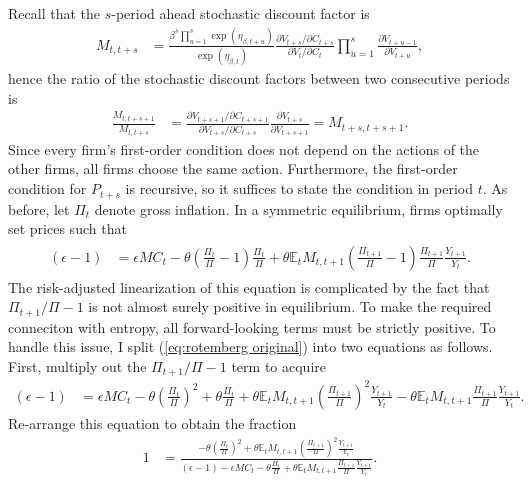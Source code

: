 \documentclass[12 pt, oneside]{article}
\theoremstyle{definition}
\theoremstyle{definition}
\theoremstyle{definition}
\newcommand{\E}{\mathbb{E}}
\begin{document}
Recall that the $s$-period ahead stochastic discount factor is
\begin{align}
  M_{t, t + s} & = \frac{\beta^s \prod_{u = 1}^s\exp(\eta_{\beta, t + u})}{\exp(\eta_{\beta, t})}\frac{\partial V_{t + s} / \partial C_{t + s}}{\partial V_t / \partial C_t} \prod_{u = 1}^s \frac{\partial V_{t + u - 1}}{\partial V_{t + u}},
\end{align}
hence the ratio of the stochastic discount factors between two consecutive periods is
\begin{align*}
  \frac{M_{t, t + s + 1}}{M_{t, t + s}} & = \frac{\partial V_{t + s + 1} / \partial C_{t + s + 1}}{\partial V_{t + s} / \partial C_{t + s}} \frac{\partial V_{t + s}}{\partial V_{t + s + 1}} = M_{t + s, t + s + 1}.
\end{align*}
Since every firm's first-order condition does not depend on the actions of the other firms, all firms choose the same action.
Furthermore, the first-order condition for $P_{t + s}$ is recursive, so it suffices to state the condition in period $t$.
As before, let $\Pi_t$ denote gross inflation. In a symmetric equilibrium, firms optimally set prices such that
\begin{align}\label{eq:rotemberg original}
  \begin{split}
    (\epsilon - 1) & = \epsilon MC_t - \theta \left(\frac{\Pi_t}{\Pi} - 1\right) \frac{\Pi_t}{\Pi} + \theta\E_t M_{t, t + 1}\left(\frac{\Pi_{t + 1}}{\Pi} - 1\right)\frac{\Pi_{t + 1}}{\Pi}\frac{Y_{t + 1}}{Y_t}.
  \end{split}
\end{align}
The risk-adjusted linearization of this equation is complicated by the fact that $\Pi_{t + 1} / \Pi - 1$ is not almost surely positive in equilibrium. To make the required conneciton with entropy, all forward-looking terms must be strictly positive. To handle this issue, I split (\ref{eq:rotemberg original}) into two equations as follows. First, multiply out the $\Pi_{t + 1} / \Pi - 1$ term to acquire
\begin{align*}
    (\epsilon - 1) & = \epsilon MC_t - \theta \left(\frac{\Pi_t}{\Pi}\right)^2 + \theta \frac{\Pi_t}{\Pi} + \theta\E_t M_{t, t + 1}\left(\frac{\Pi_{t + 1}}{\Pi}\right)^2\frac{Y_{t + 1}}{Y_t} - \theta\E_t M_{t, t + 1}\frac{\Pi_{t + 1}}{\Pi}\frac{Y_{t + 1}}{Y_t}.
\end{align*}
Re-arrange this equation to obtain the fraction
\begin{align*}
  1 & = \frac{-\theta\left(\frac{\Pi_t}{\Pi}\right)^2 + \theta\E_t M_{t, t + 1}\left(\frac{\Pi_{t + 1}}{\Pi}\right)^2\frac{Y_{t + 1}}{Y_t}}{(\epsilon - 1) - \epsilon MC_t - \theta \frac{\Pi_t}{\Pi} + \theta\E_t M_{t, t + 1}\frac{\Pi_{t + 1}}{\Pi}\frac{Y_{t + 1}}{Y_t}}.
\end{align*}
\end{document}
